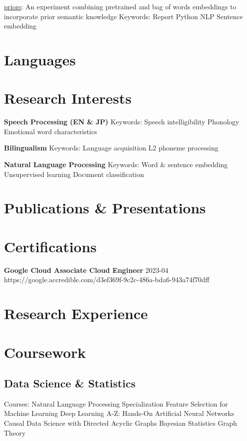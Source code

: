 \documentclass[letterpaper]{deedy-resume_sm}
\begin{document}
\href{https://github.com/ryancahildebrandt/priors}{priors}: An experiment combining pretrained and bag of words embeddings to incorporate prior semantic knowledge
Keywords: Report \textbullet{} Python \textbullet{} NLP \textbullet{} Sentence embedding

\section{Languages}

\section{Research Interests}
\textbf{Speech Processing (EN \& JP)}
Keywords: Speech intelligibility \textbullet{} Phonology \textbullet{} Emotional word characteristics

\textbf{Bilingualism}
Keywords: Language acquisition \textbullet{} L2 phoneme processing

\textbf{Natural Language Processing}
Keywords: Word \& sentence embedding \textbullet{} Unsupervised learning \textbullet{} Document classification

\section{Publications \& Presentations}

\section{Certifications}
\textbf{Google Cloud Associate Cloud Engineer}
2023-04
https://google.accredible.com/d3ef369f-9c2c-486a-bda6-943a74f70dff

\section{Research Experience}

\section{Coursework}
\subsection{Data Science \& Statistics}
Courses: Natural Language Processing Specialization \textbullet{} Feature Selection for Machine Learning \textbullet{} Deep Learning A-Z: Hands-On Artificial Neural Networks \textbullet{} Causal Data Science with Directed Acyclic Graphs \textbullet{} Bayesian Statistics \textbullet{} Graph Theory
\end{document}
